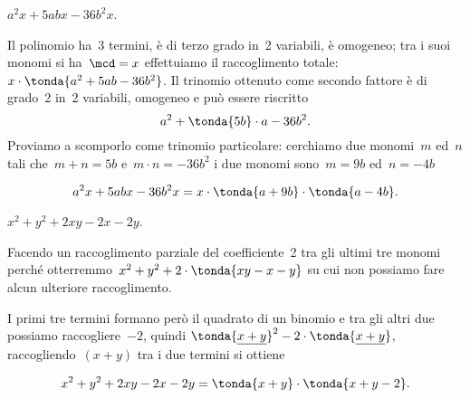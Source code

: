 % 
% 
% 
% 
% 
% 


\newpage %

 \begin{esempio}
 \(a^{2}x+5abx-36b^{2}x\).

Il polinomio ha~3 termini, è di terzo grado in~2 variabili, è omogeneo;
tra i suoi monomi si ha~\(\mcd= x\) effettuiamo il raccoglimento
totale:~\(x\cdot\tonda{a^{2}+5ab-36b^{2}}\).
Il trinomio ottenuto come secondo fattore è di grado~2 in~2 variabili,
omogeneo e può essere riscritto
\[a^{2}+\tonda{5b}\cdot a-36b^{2}.\]
Proviamo a scomporlo come trinomio particolare:
cerchiamo due monomi~\(m\) ed~\(n\) tali che~\(m+n=5b\)
e~\(m\cdot n=-36b^{2}\) i due monomi sono~\(m=9b\)
ed~\(n=-4b\)

\[a^{2}x+5abx-36b^{2}x=x\cdot\tonda{a+9b}\cdot \tonda{a-4b}.\]
 \end{esempio}

 \begin{esempio}
 \(x^2+y^{2}+2xy-2x-2y\).

Facendo un raccoglimento parziale del coefficiente~2 tra gli ultimi tre monomi 
perché otterremmo~\(x^2+y^{2}+2\cdot\tonda{xy-x-y}\) su cui non possiamo
fare alcun ulteriore raccoglimento.

I primi tre termini formano però il quadrato di un binomio e tra gli
altri due possiamo raccogliere~\(-2\), quindi
\(\tonda{\underline{{x+y}}}^{2}-2\cdot\tonda{\underline{{x+y}}}\),
raccogliendo~\((x + y)\) tra i due termini si ottiene

\begin{equation*}
x^2+y^{2}+2xy-2x-2y=\tonda{x+y}\cdot \tonda{x+y-2}.
\end{equation*}
 \end{esempio}

